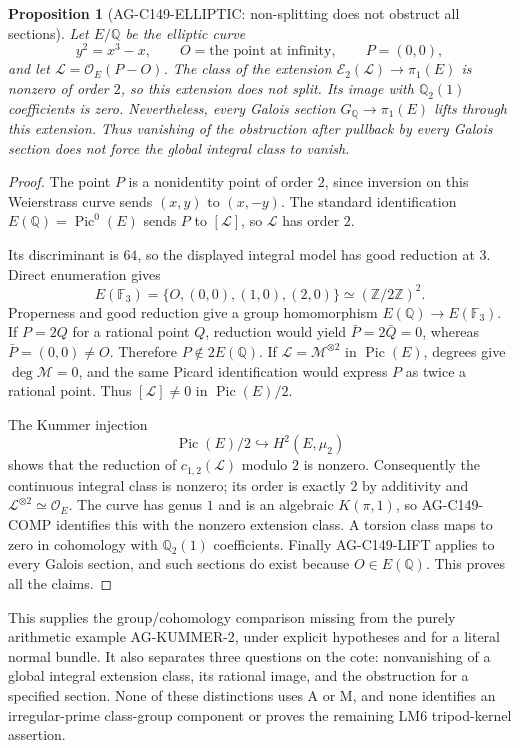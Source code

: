 \documentclass[11pt,a4paper]{article}
\newtheorem{proposition}{Proposition}
\begin{document}
\begin{proposition}[AG-C149-ELLIPTIC: non-splitting does not obstruct all sections]
Let $E/\mathbb Q$ be the elliptic curve
\[
 y^2=x^3-x,
 \qquad O=\text{the point at infinity},\qquad P=(0,0),
\]
and let $\mathcal L=\mathcal O_E(P-O)$.
The class of the extension $\mathcal E_2(\mathcal L)\to\pi_1(E)$
is nonzero of order $2$, so this extension does not split. Its image
with $\mathbb Q_2(1)$ coefficients is zero. Nevertheless, every
Galois section $G_{\mathbb Q}\to\pi_1(E)$ lifts through this
extension. Thus vanishing of the obstruction after pullback by
every Galois section does not force the global integral class to
vanish.
\end{proposition}
\begin{proof}
The point $P$ is a nonidentity point of order $2$, since inversion on
this Weierstrass curve sends $(x,y)$ to $(x,-y)$. The standard
identification $E(\mathbb Q)=\operatorname{Pic}^0(E)$ sends $P$ to
$[\mathcal L]$, so $\mathcal L$ has order $2$.

Its discriminant is $64$, so the displayed integral model has good
reduction at $3$. Direct enumeration gives
\[
 E(\mathbb F_3)=\{O,(0,0),(1,0),(2,0)\}
                 \simeq(\mathbb Z/2\mathbb Z)^2.
\]
Properness and good reduction give a group homomorphism
$E(\mathbb Q)\to E(\mathbb F_3)$. If $P=2Q$ for a rational point
$Q$, reduction would yield $\bar P=2\bar Q=0$, whereas
$\bar P=(0,0)\ne O$. Therefore $P\notin2E(\mathbb Q)$.
If $\mathcal L=\mathcal M^{\otimes2}$ in $\operatorname{Pic}(E)$,
degrees give $\deg\mathcal M=0$, and the same Picard identification
would express $P$ as twice a rational point. Thus
$[\mathcal L]\ne0$ in $\operatorname{Pic}(E)/2$.

The Kummer injection
\[
 \operatorname{Pic}(E)/2\hookrightarrow H^2(E,\mu_2)
\]
shows that the reduction of $c_{1,2}(\mathcal L)$ modulo $2$ is
nonzero. Consequently the continuous integral class is nonzero;
its order is exactly $2$ by additivity and $\mathcal L^{\otimes2}
\simeq\mathcal O_E$. The curve has genus $1$ and is an algebraic
$K(\pi,1)$, so AG-C149-COMP identifies this with the nonzero
extension class. A torsion class maps to zero in cohomology with
$\mathbb Q_2(1)$ coefficients. Finally AG-C149-LIFT applies to
every Galois section, and such sections do exist because
$O\in E(\mathbb Q)$. This proves all the claims.
\end{proof}

This supplies the group/cohomology comparison missing from the purely
arithmetic example AG-KUMMER-2, under explicit hypotheses and for a
literal normal bundle. It also separates three questions on the cote:
nonvanishing of a global integral extension class, its rational image,
and the obstruction for a specified section. None of these distinctions
uses A or M, and none identifies an irregular-prime class-group
component or proves the remaining LM6 tripod-kernel assertion.
\end{document}

